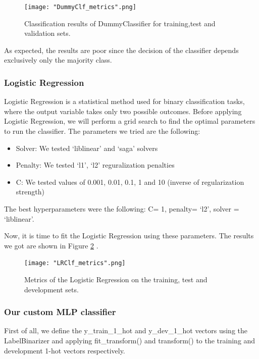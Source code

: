 \documentclass[10pt, a4paper]{article}
\begin{document}
	\begin{figure}
		\centering
		\texttt{[image: "DummyClf\_metrics".png]}
		\caption{Classification results of DummyClassifier for training,test and validation sets.}
		\label{fig::dummy_metrics}
	\end{figure}
	
	
	As expected, the results are poor since the decision of the classifier depends exclusively only the majority class.
	
	\subsubsection{Logistic Regression}
	Logistic Regression is a statistical method used for binary classification tasks, where the output variable takes only two possible outcomes.
	Before applying Logistic Regression, we will perform a grid search to find the optimal parameters to run the classifier. The parameters we tried are the following:
	\begin{itemize}
		\item{Solver: We tested ‘liblinear’ and ‘saga’ solvers}
		\item{Penalty: We tested ‘l1’, ‘l2’ reguralization penalties}
		\item{C: We tested values of 0.001, 0.01, 0.1, 1 and 10 (inverse of regularization strength)}
	\end{itemize}
	
	The best hyperparameters were the following:
	C= 1, penalty= ‘l2’, solver = ‘liblinear’.
	
	Now, it is time to fit the Logistic Regression using these parameters. The results we got are shown in Figure \ref{fig::LR_metrics} .
	
	\begin{figure}
		\centering
		\texttt{[image: "LRClf\_metrics".png]}
		\caption{Metrics of the Logistic Regression on the training, test and development sets.}
		\label{fig::LR_metrics}
	\end{figure}
	
	
	\subsubsection{Our custom MLP classifier}
	
	First of all, we define the y\_train\_1\_hot and y\_dev\_1\_hot vectors using the LabelBinarizer and applying fit\_transform() and transform() to the training and development 1-hot vectors respectively.
	
\end{document}

